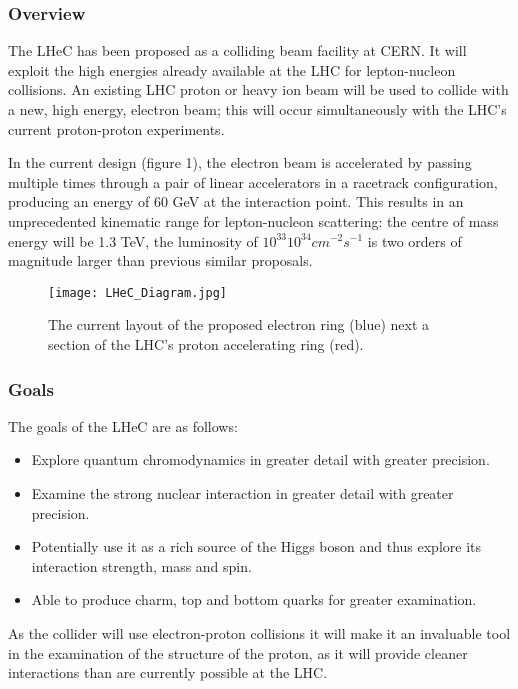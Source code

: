 \subsubsection{Overview}

The LHeC has been proposed as a colliding beam facility at CERN. It will exploit the high energies already available at the LHC for lepton-nucleon collisions. An existing LHC proton or heavy ion beam will be used to collide with a new, high energy, electron beam; this will occur simultaneously with the LHC's current proton-proton experiments.
 
In the current design (figure 1), the electron beam is accelerated by passing multiple times through a pair of linear accelerators in a racetrack configuration, producing an energy of 60 GeV at the interaction point. This results in an unprecedented kinematic range for lepton-nucleon scattering: the centre of mass energy will be 1.3 TeV, the luminosity of $10^{33}$\textendash $10^{34} cm^{-2}s^{-1}$ is two orders of magnitude larger than previous similar proposals. \cite{LHeC:Birmingham}

\begin{figure}[!htb]
\centering
\texttt{[image: LHeC\_Diagram.jpg]}
\caption{The current layout of the proposed electron ring (blue) next a section of the LHC's proton accelerating ring (red).
}
\end{figure}

\subsubsection{Goals}

The goals of the LHeC are as follows:
\begin{itemize}
\item Explore quantum chromodynamics in greater detail with greater precision.
\item Examine the strong nuclear interaction in greater detail with greater precision.
\item Potentially use it as a rich source of the Higgs boson and thus explore its interaction strength, mass and spin.
\item Able to produce charm, top and bottom quarks for greater examination.
\end{itemize}
As the collider will use electron-proton collisions it will make it an invaluable tool in the examination of the structure of the proton, as it will provide cleaner interactions than are currently possible at the LHC.
 
